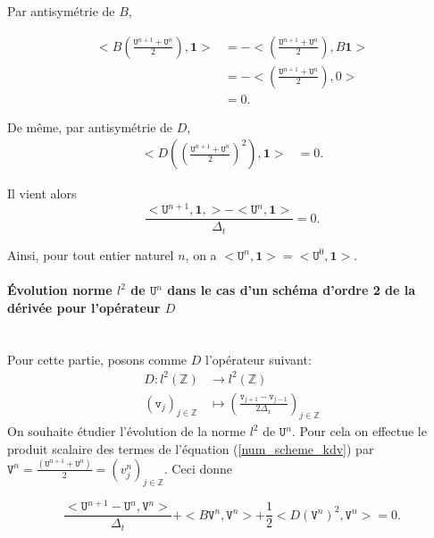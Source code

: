 \documentclass[12pt,a4paper]{article}
\numberwithin{equation}{section}
\begin{document}
Par antisymétrie de $B$, 

\begin{equation*}
    \begin{split}
        <B\left(\frac{\texttt{U}^{n+1} + \texttt{U}^{n}}{2}\right),\textbf{1}> &= -<\left(\frac{\texttt{U}^{n+1} + \texttt{U}^{n}}{2}\right),B\textbf{1}>\\
        &= -<\left(\frac{\texttt{U}^{n+1} + \texttt{U}^{n}}{2}\right),0>\\
        &= 0.
    \end{split}
\end{equation*}

De même, par antisymétrie de $D$, 
\begin{equation*}
    \begin{split}
        <D\left( \left(\frac{\texttt{U}^{n+1} + \texttt{U}^{n}}{2}\right)^2 \right),\textbf{1}> &= 0.
    \end{split}
\end{equation*}

Il vient alors 
\begin{equation*}
    \frac{<\texttt{U}^{n+1},\textbf{1},>-<\texttt{U}^n,\textbf{1}>}{\Delta_t} = 0 .
\end{equation*}

Ainsi, pour tout entier naturel $n$, on a $<\texttt{U}^n,\textbf{1}> = <\texttt{U}^0,\textbf{1}>$.

\paragraph{Évolution norme $l^2$ de $\texttt{U}^n$ dans le cas d'un schéma d'ordre 2 de la dérivée pour l'opérateur $D$}\,\\

Pour cette partie, posons comme $D$ l'opérateur suivant:
\begin{align*}
        D : l^2(\mathbb{Z}) &\longrightarrow l^2(\mathbb{Z})\\
        (\texttt{v}_j)_{j\in\mathbb{Z}} &\mapsto \left(\frac{\texttt{v}_{j+1} - \texttt{v}_{j-1} }{2\Delta_x}\right)_{j\in\mathbb{Z}}
\end{align*}
On souhaite étudier l'évolution de la norme $l^2$ de $\texttt{U}^n$.  Pour cela on effectue le produit scalaire des termes de l'équation (\ref{num_scheme_kdv}) par $ \texttt{V}^n = \frac{(\texttt{U}^{n+1} + \texttt{U}^{n})}{2} = (v^n_j)_{j\in\mathbb{Z}}$. Ceci donne

\begin{equation*}
    \frac{<\texttt{U}^{n+1} - \texttt{U}^n,\texttt{V}^n>}{\Delta_t} + <B\texttt{V}^n,\texttt{V}^n> + \frac{1}{2}<D (\texttt{V}^n)^2 ,\texttt{V}^n> = 0 .
\end{equation*}
\end{document}
